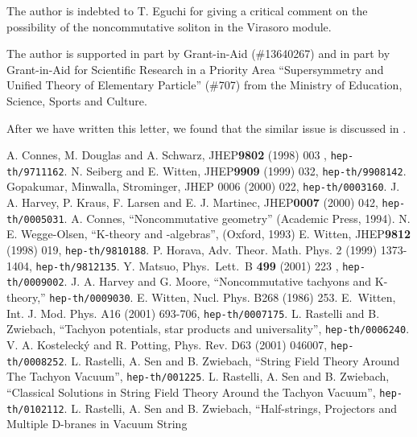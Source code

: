 \documentclass[a4paper,12pt]{article}
\begin{document}
The author is indebted to T. Eguchi for giving a critical 
comment on the possibility of the 
noncommutative soliton in the Virasoro module.

The author is supported in part by Grant-in-Aid (\#13640267)
and in part by Grant-in-Aid for Scientific Research
in a Priority Area ``Supersymmetry and Unified Theory of 
Elementary Particle'' (\#707) from the Ministry of Education,
Science, Sports and Culture.


\vskip 5mm



 After we have written this letter,
we found that the similar issue is discussed in \cite{r-RSZ3}.


\begin{thebibliography}{99}
 A. Connes, M. Douglas and A. Schwarz,
JHEP{\bf 9802} (1998) 003
, {\tt hep-th/9711162}.
 N. Seiberg and E. Witten,
JHEP{\bf 9909} (1999) 032, {\tt hep-th/9908142}.
 Gopakumar, Minwalla, Strominger,
JHEP 0006 (2000) 022, {\tt hep-th/0003160}.
 J. A. Harvey, P. Kraus, F. Larsen and E. J. Martinec,
JHEP{\bf 0007}
(2000) 042, {\tt hep-th/0005031}.
 A. Connes, ``Noncommutative geometry'' 
(Academic Press, 1994).
 N. E. Wegge-Olsen, ``K-theory and \coordHE{}-algebras'',
(Oxford, 1993)
 E. Witten, %
JHEP{\bf 9812} (1998) 019, {\tt hep-th/9810188}.
 P. Horava, Adv. Theor. Math. Phys. 2 
(1999) 1373-1404, {\tt hep-th/9812135}.
 Y. Matsuo, 
Phys.\ Lett.\ B {\bf 499} (2001) 223
, {\tt hep-th/0009002}.
 J. A. Harvey and G. Moore,
``Noncommutative tachyons and K-theory,''
{\tt hep-th/0009030}.
 E. Witten, 
Nucl. Phys. B268 (1986) 253.
 E.~Witten,
Int. J. Mod. Phys. A16 (2001) 693-706,
{\tt hep-th/0007175}.
 L. Rastelli and B. Zwiebach, ``Tachyon
potentials, star products and universality'', {\tt hep-th/0006240}.
 V. A. Kosteleck\'y and R. Potting,
Phys. Rev. D63 (2001) 046007,
{\tt hep-th/0008252}.
 L. Rastelli, A. Sen and B. Zwiebach,
``String Field Theory Around The Tachyon Vacuum'',
{\tt hep-th/001225}.
 L. Rastelli, A. Sen and B. Zwiebach,
``Classical Solutions in String Field Theory Around
the Tachyon Vacuum'', {\tt hep-th/0102112}.
 L. Rastelli, A. Sen and B. Zwiebach,
``Half-strings, Projectors and Multiple D-branes in Vacuum String

\end{thebibliography}
\end{document}
